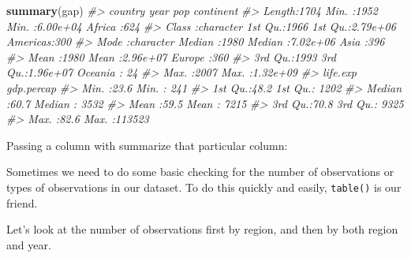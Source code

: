 \documentclass[]{book}
\newenvironment{Shaded}{\begin{snugshade}}{\end{snugshade}}
\newcommand{\KeywordTok}[1]{\textcolor[rgb]{0.13,0.29,0.53}{\textbf{#1}}}
\newcommand{\CommentTok}[1]{\textcolor[rgb]{0.56,0.35,0.01}{\textit{#1}}}
\newcommand{\OperatorTok}[1]{\textcolor[rgb]{0.81,0.36,0.00}{\textbf{#1}}}
\newcommand{\NormalTok}[1]{#1}
\begin{document}
\begin{Shaded}
\begin{Highlighting}[]
\KeywordTok{summary}\NormalTok{(gap)}
\CommentTok{#>    country               year           pop              continent  }
\CommentTok{#>  Length:1704        Min.   :1952   Min.   :6.00e+04   Africa  :624  }
\CommentTok{#>  Class :character   1st Qu.:1966   1st Qu.:2.79e+06   Americas:300  }
\CommentTok{#>  Mode  :character   Median :1980   Median :7.02e+06   Asia    :396  }
\CommentTok{#>                     Mean   :1980   Mean   :2.96e+07   Europe  :360  }
\CommentTok{#>                     3rd Qu.:1993   3rd Qu.:1.96e+07   Oceania : 24  }
\CommentTok{#>                     Max.   :2007   Max.   :1.32e+09                 }
\CommentTok{#>     life.exp      gdp.percap    }
\CommentTok{#>  Min.   :23.6   Min.   :   241  }
\CommentTok{#>  1st Qu.:48.2   1st Qu.:  1202  }
\CommentTok{#>  Median :60.7   Median :  3532  }
\CommentTok{#>  Mean   :59.5   Mean   :  7215  }
\CommentTok{#>  3rd Qu.:70.8   3rd Qu.:  9325  }
\CommentTok{#>  Max.   :82.6   Max.   :113523}
\end{Highlighting}
\end{Shaded}

Passing a column with summarize that particular column:

\begin{Shaded}
\end{Shaded}

Sometimes we need to do some basic checking for the number of
observations or types of observations in our dataset. To do this quickly
and easily, \texttt{table()} is our friend.

Let's look at the number of observations first by region, and then by
both region and year.

\begin{Shaded}
\end{Shaded}
\end{document}
